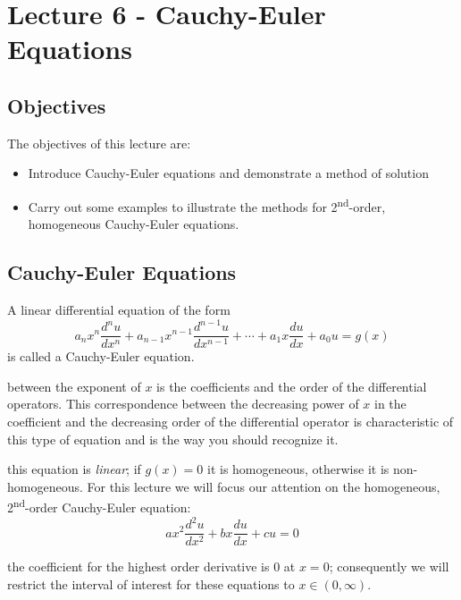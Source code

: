 \chapter{Lecture 6 - Cauchy-Euler Equations}
\label{ch:lec6}
\section{Objectives}
The objectives of this lecture are:
\begin{itemize}
\item Introduce Cauchy-Euler equations and demonstrate a method of solution
\item Carry out some examples to illustrate the methods for 2\textsuperscript{nd}-order, homogeneous Cauchy-Euler equations.
\end{itemize}

\section{Cauchy-Euler Equations}

A linear differential equation of the form
\begin{equation}
a_nx^n\frac{d^n u}{dx^n}+a_{n-1}x^{n-1}\frac{d^{n-1}u}{dx^{n-1}}+\cdots+a_1x\frac{du}{dx}+a_0u=g(x)
\label{eq:cauchy-euler-eqn}
\end{equation}
is called a Cauchy-Euler equation.

 between the exponent of $x$ is the coefficients and the order of the differential operators.  This correspondence between the decreasing power of $x$ in the coefficient and the decreasing order of the differential operator is characteristic of this type of equation and is the way you should recognize it. 

 this equation is \emph{linear}; if $g(x)=0$ it is homogeneous, otherwise it is non-homogeneous.  For this lecture we will focus our attention on the homogeneous, 2\textsuperscript{nd}-order Cauchy-Euler equation:
\begin{equation}
ax^2\frac{d^2u}{dx^2}+bx\frac{du}{dx}+cu=0
\end{equation}

 the coefficient for the highest order derivative is 0 at $x=0$; consequently we will restrict the interval of interest for these equations to $x \in \left(0,\infty\right)$.

